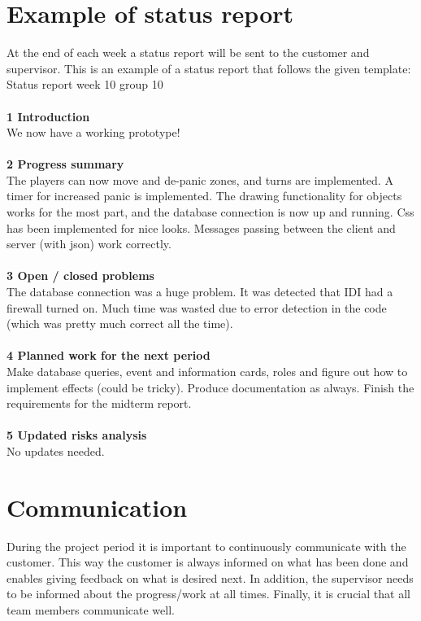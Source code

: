 \section{Example of status report}
At the end of each week a status report will be sent to the customer and supervisor. This is an example of a status report that follows the given template: \\
\newline
Status report week 10 group 10\\
\\
\textbf{1 Introduction}\\
We now have a working prototype!\\
\\
\textbf{2 Progress summary}\\
The players can now move and de-panic zones, and turns are implemented. A timer for increased panic is implemented. The drawing functionality for objects works for the most part, and the database connection is now up and running. Css has been implemented for nice looks. Messages passing between the client and server (with json) work correctly.\\
\\
\textbf{3 Open / closed problems}\\
The database connection was a huge problem. It was detected that IDI had a firewall turned on. Much time was wasted due to error detection in the code (which was pretty much correct all the time).\\
\\
\textbf{4 Planned work for the next period}\\
Make database queries, event and information cards, roles and figure out how to implement effects (could be tricky). Produce documentation as always. Finish the requirements for the midterm report.\\
\\
\textbf{5 Updated risks analysis}\\
No updates needed.\\


\section{Communication}
During the project period it is important to continuously communicate with the customer. This way the customer is always informed on what has been done and enables giving feedback on what is desired next. In addition, the supervisor needs to be informed about the progress/work at all times. Finally, it is crucial that all team members communicate well.

